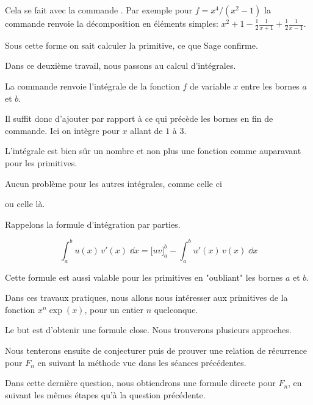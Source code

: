 \change  
Cela se fait avec la commande . Par exemple pour
$f = x^4/(x^2-1)$ la commande  
renvoie la décomposition en éléments simples: %
$x^2 + 1 - \frac12\frac{1}{x + 1} + \frac12\frac{1}{x - 1}$.

\change

\change
Sous cette forme on sait calculer la primitive, ce que Sage confirme.

\diapo

Dans ce deuxième travail, nous passons au calcul d'intégrales. 

\change

La commande
 renvoie l'intégrale de la fonction $f$ de variable $x$ entre les bornes $a$ et $b$. 

Il suffit donc d'ajouter par rapport à ce qui précède les bornes en fin de commande. Ici on intègre pour $x$ allant de $1$ à $3$.

\change
L'intégrale est bien sûr un nombre et non plus une fonction comme auparavant pour les primitives.

\change
Aucun problème pour les autres intégrales, comme celle ci

\change
ou celle là.


\diapo

Rappelons la formule d'intégration par parties.

$$\int_a^b u(x) \, v'(x)\;\dd x= \big[uv\big]_a^b - \int_a^b u'(x) \, v(x)\;\dd x$$

Cette formule est aussi valable pour les primitives en "oubliant" les bornes $a$ et $b$.


\diapo

Dans ces travaux pratiques, nous allons nous intéresser aux primitives de la fonction $x^n\exp(x)$, pour un entier $n$ quelconque.

Le but est d'obtenir une formule close.
 Nous trouverons plusieurs approches. 

Nous tenterons ensuite de conjecturer puis de prouver une relation de récurrence pour $F_n$ en suivant la méthode vue dans les séances précédentes.

Dans cette dernière question, nous obtiendrons une formule directe pour $F_n$, en suivant les mêmes étapes qu'à la question précédente.



